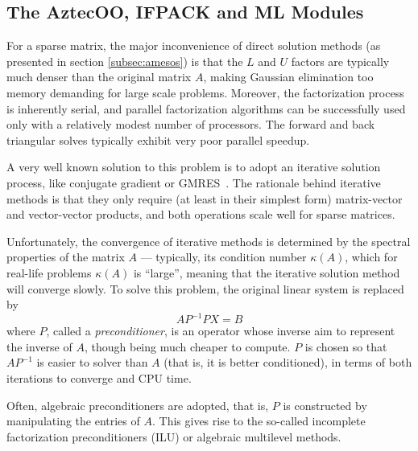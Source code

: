 \documentclass[10pt,relax]{SANDreport}
\begin{document}
\subsection{The AztecOO, IFPACK and ML Modules}
\label{subsec:aztecoo_ifpack}

For a sparse matrix, the major inconvenience of direct solution
methods (as presented in section \ref{subsec:amesos}) 
  is that the $L$ and $U$ factors are typically much denser than
the original matrix $A$, making Gaussian elimination too memory
demanding for large scale problems. Moreover, the factorization
process is inherently serial, and parallel factorization algorithms
can be successfully used only with a relatively modest number of
processors. The forward and back triangular solves typically exhibit
very poor parallel speedup.

A very well known solution to this problem is to adopt an iterative
solution process, like conjugate gradient or GMRES~\cite{golub96matrix}. The
rationale behind iterative methods is that they only require (at least
in their simplest form) matrix-vector and vector-vector products, and
both operations scale well for sparse matrices.

Unfortunately, the convergence of iterative methods is determined by
the spectral properties of the matrix $A$ --- typically, its condition
number $\kappa(A)$, which for real-life problems $\kappa(A)$ is
``large'', meaning that the iterative solution method will converge
slowly. To solve this problem, the original linear system is replaced
by
\[
A P^{-1} P X = B
\]
where $P$, called a {\sl preconditioner}, is an operator whose inverse
aim to represent the inverse of $A$, though being much cheaper to
compute.  $P$ is chosen so that $AP^{-1}$ is easier to solver than $A$
(that is, it is better conditioned), in terms of both iterations to converge
and CPU time.

\smallskip

Often, algebraic preconditioners are adopted, that is, $P$ is
constructed by manipulating the entries of $A$. This gives rise to the
so-called incomplete factorization preconditioners (ILU) or algebraic
multilevel methods.
\end{document}
